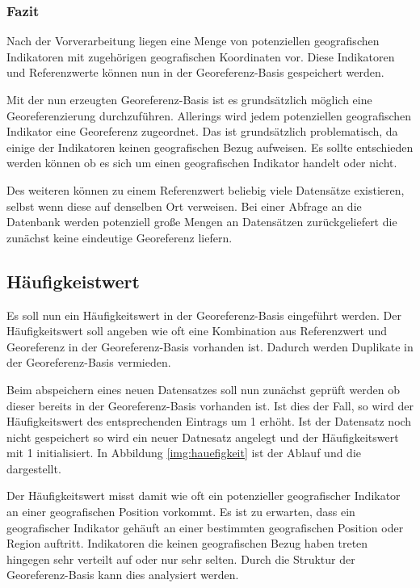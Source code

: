 			\subsubsection{Fazit} 

				Nach der Vorverarbeitung liegen eine Menge von potenziellen geografischen Indikatoren mit zugehörigen geografischen Koordinaten vor.
				Diese Indikatoren und Referenzwerte können nun in der Georeferenz-Basis gespeichert werden.

				Mit der nun erzeugten Georeferenz-Basis ist es grundsätzlich möglich eine Georeferenzierung durchzuführen. 
				Allerings wird jedem potenziellen geografischen Indikator eine Georeferenz zugeordnet.
				Das ist grundsätzlich problematisch, da einige der Indikatoren keinen geografischen Bezug aufweisen. 
				Es sollte entschieden werden können ob es sich um einen geografischen Indikator handelt oder nicht. 

				Des weiteren können zu einem Referenzwert beliebig viele Datensätze existieren, selbst wenn diese auf denselben Ort verweisen. 
				Bei einer Abfrage an die Datenbank werden potenziell große Mengen an Datensätzen zurückgeliefert die zunächst keine eindeutige Georeferenz liefern.

		\subsection{Häufigkeistwert}

			Es soll nun ein Häufigkeitswert in der Georeferenz-Basis eingeführt werden.
			Der Häufigkeitswert soll angeben wie oft eine Kombination aus Referenzwert und Georeferenz in der Georeferenz-Basis vorhanden ist.
			Dadurch werden Duplikate in der Georeferenz-Basis vermieden.

			Beim abspeichern eines neuen Datensatzes soll nun zunächst geprüft werden ob dieser bereits in der Georeferenz-Basis vorhanden ist. 
			Ist dies der Fall, so wird der Häufigkeitswert des entsprechenden Eintrags um 1 erhöht.
			Ist der Datensatz noch nicht gespeichert so wird ein neuer Datnesatz angelegt und der Häufigkeitswert mit 1 initialisiert.
			In Abbildung \ref{img:hauefigkeit} ist der Ablauf und die  dargestellt. 

			Der Häufigkeitswert misst damit wie oft ein potenzieller geografischer Indikator an einer geografischen Position vorkommt.
			Es ist zu erwarten, dass ein geografischer Indikator gehäuft an einer bestimmten geografischen Position oder Region auftritt.
			Indikatoren die keinen geografischen Bezug haben treten hingegen sehr verteilt auf oder nur sehr selten. 
			Durch die Struktur der Georeferenz-Basis kann dies analysiert werden.

